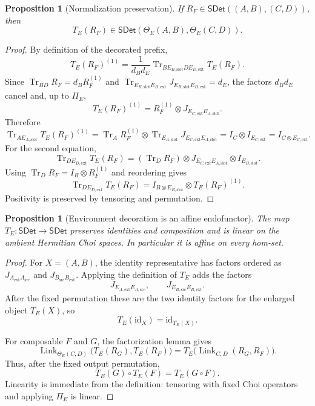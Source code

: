 \documentclass[11pt,a4paper]{article}
\theoremstyle{definition}
\theoremstyle{plain}
\newtheorem{proposition}[theorem]{Proposition}
\theoremstyle{remark}
\DeclareMathOperator{\Tr}{Tr}
\newcommand{\id}{\mathrm{id}}
\newcommand{\SDet}{\mathsf{SDet}}
\begin{document}
\begin{proposition}[Normalization preservation]
If $R_F\in\SDet((A,B),(C,D))$, then
\[
T_E(R_F)\in\SDet(\Theta_E(A,B),\Theta_E(C,D)).
\]
\end{proposition}
\begin{proof}
By definition of the decorated prefix,
\[
T_E(R_F)^{(1)}=
\frac{1}{d_Bd_E}\Tr_{B E_{B,\mathrm{slot}}D E_{D,\mathrm{ext}}}T_E(R_F).
\]
Since $\Tr_{BD}R_F=d_B R_F^{(1)}$ and
$\Tr_{E_{B,\mathrm{slot}}E_{D,\mathrm{ext}}}
J_{E_{B,\mathrm{slot}}E_{D,\mathrm{ext}}}=d_E$, the factors $d_Bd_E$
cancel and, up to $\Pi_E$,
\[
T_E(R_F)^{(1)}=R_F^{(1)}\otimes J_{E_{C,\mathrm{ext}}E_{A,\mathrm{slot}}}.
\]
Therefore
\[
\Tr_{A E_{A,\mathrm{slot}}}T_E(R_F)^{(1)}
=\Tr_A R_F^{(1)}\otimes\Tr_{E_{A,\mathrm{slot}}}J_{E_{C,\mathrm{ext}}E_{A,\mathrm{slot}}}
=I_C\otimes I_{E_{C,\mathrm{ext}}}
=I_{C\otimes E_{C,\mathrm{ext}}}.
\]
For the second equation,
\[
\Tr_{D E_{D,\mathrm{ext}}}T_E(R_F)
=(\Tr_D R_F)\otimes J_{E_{C,\mathrm{ext}}E_{A,\mathrm{slot}}}\otimes I_{E_{B,\mathrm{slot}}}.
\]
Using $\Tr_D R_F=I_B\otimes R_F^{(1)}$ and reordering gives
\[
\Tr_{D E_{D,\mathrm{ext}}}T_E(R_F)
=I_{B\otimes E_{B,\mathrm{slot}}}\otimes T_E(R_F)^{(1)}.
\]
Positivity is preserved by tensoring and permutation.
\end{proof}

\begin{proposition}[Environment decoration is an affine endofunctor]
\label{prop:TE-strict}
The map $T_E:\SDet\to\SDet$ preserves identities and composition and is linear on the ambient Hermitian Choi spaces. In particular it is affine on every hom-set.
\end{proposition}
\begin{proof}
For $X=(A,B)$, the identity representative has factors ordered as
$J_{A_{\mathrm{ext}}A_{\mathrm{src}}}$ and
$J_{B_{\mathrm{src}}B_{\mathrm{ext}}}$. Applying the definition of $T_E$
adds the factors
\[
J_{E_{A,\mathrm{ext}}E_{A,\mathrm{src}}},
\qquad
J_{E_{B,\mathrm{src}}E_{B,\mathrm{ext}}}.
\]
After the fixed permutation these are the two identity factors
for the enlarged object $T_E(X)$, so
\[
T_E(\id_X)=\id_{T_E(X)}.
\]

For composable $F$ and $G$, the factorization lemma gives
\[
\operatorname{Link}_{\Theta_E(C,D)}
\bigl(T_E(R_G),T_E(R_F)\bigr)
=T_E\bigl(\operatorname{Link}_{C,D}(R_G,R_F)\bigr).
\]
Thus, after the fixed output permutation,
\[
T_E(G)\circ T_E(F)=T_E(G\circ F).
\]
Linearity is immediate from the definition: tensoring with fixed Choi
operators and applying $\Pi_E$ is linear.
\end{proof}
\end{document}
